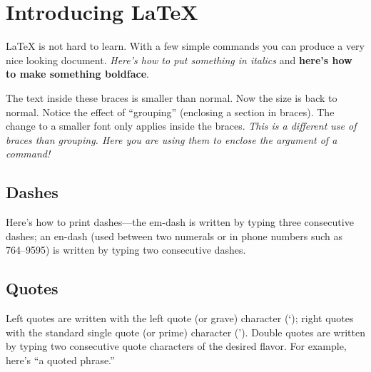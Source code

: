 \documentclass[12pt]{article}                    %
\begin{document}

\section*{Introducing LaTeX}                %
LaTeX is not hard to learn.  With a few simple commands you
can produce a very nice looking document.
\textit{Here's how to put something in italics} and
\textbf{here's how to make something boldface}.

{\small The text inside these braces is smaller than normal.} Now the size
is back to normal.
Notice the effect of ``grouping'' (enclosing a section in braces).
The change to a smaller font only applies inside the braces.
\textit{This is a different use of braces than grouping. Here you are
using them to enclose the argument of a command!}

\subsection*{Dashes}                        %
Here's how to print dashes---the em-dash is written by typing three
consecutive dashes; an en-dash (used between two numerals or in phone
numbers such as 764--9595) is written by typing two consecutive dashes.

\subsection*{Quotes}                        %
Left quotes are written with the left quote (or grave) character (`);
right quotes with the standard single quote (or prime) character (').
Double quotes are written by typing two consecutive quote characters
of the desired flavor. For example, here's ``a quoted phrase.''
\end{document}
